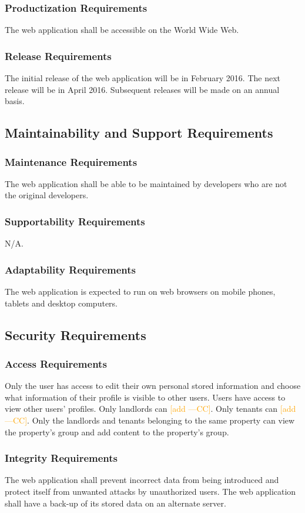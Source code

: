 \documentclass[12pt, titlepage]{article}
\newcommand{\authornote}[3]{\textcolor{#1}{[#3 ---#2]}}
\newcommand{\authornote}[3]{}
\newcommand{\cc}[1]{\authornote{orange}{CC}{#1}}
\begin{document}
{\subsubsection{Productization Requirements}
The web application shall be accessible on the World Wide Web.
\subsubsection{Release Requirements}
The initial release of the web application will be in February 2016. The next release will be in April 2016. Subsequent releases will be made on an annual basis.
\subsection{Maintainability and Support Requirements}
\subsubsection{Maintenance Requirements}
The web application shall be able to be maintained by developers who are not the original developers.
\subsubsection{Supportability Requirements}
N/A.
\subsubsection{Adaptability Requirements}
The web application is expected to run on web browsers on mobile phones, tablets and desktop computers.
\subsection{Security Requirements}
\subsubsection{Access Requirements}
Only the user has access to edit their own personal stored information and choose what information of their profile is visible to other users. Users have access to view other users' profiles. Only landlords can \cc{add}. Only tenants can \cc{add}. Only the landlords and tenants belonging to the same property can view the property's group and add content to the property's group.
\subsubsection{Integrity Requirements}
The web application shall prevent incorrect data from being introduced and protect itself from unwanted attacks by unauthorized users. The web application shall have a back-up of its stored data on an alternate server.
}
\end{document}

